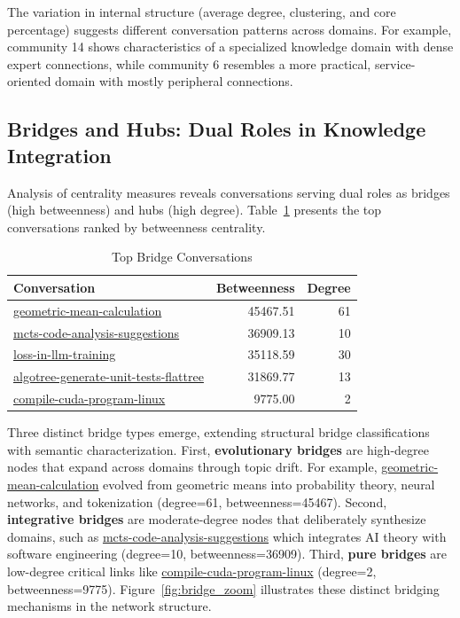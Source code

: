 \documentclass{svproc}
\begin{document}
The variation in internal structure (average degree, clustering, and core percentage) suggests different conversation patterns across domains. For example, community 14 shows characteristics of a specialized knowledge domain with dense expert connections, while community 6 resembles a more practical, service-oriented domain with mostly peripheral connections.

\subsection{Bridges and Hubs: Dual Roles in Knowledge Integration}

Analysis of centrality measures reveals conversations serving dual roles as bridges (high betweenness) and hubs (high degree). Table~\ref{tab:bridges} presents the top conversations ranked by betweenness centrality.

\begin{table}
\centering
\caption{Top Bridge Conversations}
\label{tab:bridges}
\begin{tabular}{lrr}
\toprule
\textbf{Conversation} & \textbf{Betweenness} & \textbf{Degree} \\
\midrule
\url{geometric-mean-calculation} & 45467.51 & 61 \\
\url{mcts-code-analysis-suggestions} & 36909.13 & 10 \\
\url{loss-in-llm-training} & 35118.59 & 30 \\
\url{algotree-generate-unit-tests-flattree} & 31869.77 & 13 \\
\url{compile-cuda-program-linux} & 9775.00 & 2 \\
\bottomrule
\end{tabular}
\end{table}

Three distinct bridge types emerge, extending structural bridge classifications \cite{granovetter1973,burt1992} with semantic characterization. First, \textbf{evolutionary bridges} are high-degree nodes that expand across domains through topic drift. For example, \url{geometric-mean-calculation} evolved from geometric means into probability theory, neural networks, and tokenization (degree=61, betweenness=45467). Second, \textbf{integrative bridges} are moderate-degree nodes that deliberately synthesize domains, such as \url{mcts-code-analysis-suggestions} which integrates AI theory with software engineering (degree=10, betweenness=36909). Third, \textbf{pure bridges} are low-degree critical links like \url{compile-cuda-program-linux} (degree=2, betweenness=9775). Figure~\ref{fig:bridge_zoom} illustrates these distinct bridging mechanisms in the network structure.
\end{document}

